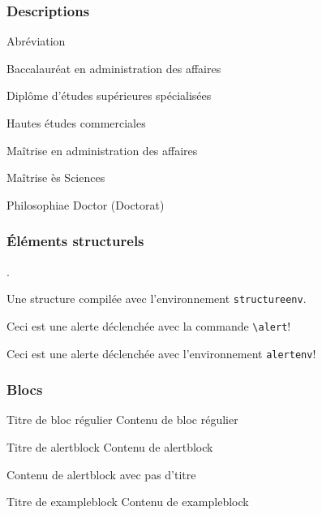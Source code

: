\documentclass[aspectratio=1610,compress,t,english,french]{beamer}
\begin{document}
\begin{frame}
\frametitle{Descriptions}

	\begin{description}[ABBR]
		\item[ABBR] Abréviation
		\item[BAA] Baccalauréat en administration des affaires
		\item[DESS] Diplôme d'études supérieures spécialisées
		\item[HEC] Hautes études commerciales
		\item[MBA] Maîtrise en administration des affaires
		\item[MSc] Maîtrise ès Sciences
		\item[PhD] Philosophiae Doctor (Doctorat)
	\end{description}
\end{frame}

\begin{frame}[c]
\frametitle{Éléments structurels}
	.
	
	\begin{structureenv}
		Une structure compilée avec l'environnement \texttt{structureenv}.
	\end{structureenv}

	\alert{Ceci est une alerte déclenchée avec la commande \texttt{\textbackslash alert}!}
	
	\begin{alertenv}
		Ceci est une alerte déclenchée avec l'environnement \texttt{alertenv}!
	\end{alertenv}
\end{frame}

\begin{frame}[c]
\frametitle{Blocs}

	\begin{block}{Titre de bloc régulier}
		Contenu de bloc régulier
	\end{block}

	\begin{alertblock}{Titre de alertblock}
		Contenu de alertblock
	\end{alertblock}

	\begin{alertblock}{}
		Contenu de alertblock avec pas d'titre
	\end{alertblock}

	\begin{exampleblock}{Titre de exampleblock}
		Contenu de exampleblock
	\end{exampleblock}
	
\end{frame}
\end{document}
